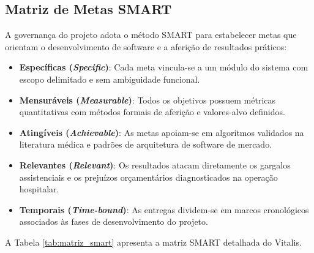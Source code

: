 \subsection{Matriz de Metas SMART}
\label{subsec:metas_smart}

A governança do projeto adota o método SMART para estabelecer metas que orientam o desenvolvimento de software e a aferição de resultados práticos:

\begin{itemize}[leftmargin=*]
    \item \textbf{Específicas (\textit{Specific})}: Cada meta vincula-se a um módulo do sistema com escopo delimitado e sem ambiguidade funcional.
    \item \textbf{Mensuráveis (\textit{Measurable})}: Todos os objetivos possuem métricas quantitativas com métodos formais de aferição e valores-alvo definidos.
    \item \textbf{Atingíveis (\textit{Achievable})}: As metas apoiam-se em algoritmos validados na literatura médica e padrões de arquitetura de software de mercado.
    \item \textbf{Relevantes (\textit{Relevant})}: Os resultados atacam diretamente os gargalos assistenciais e os prejuízos orçamentários diagnosticados na operação hospitalar.
    \item \textbf{Temporais (\textit{Time-bound})}: As entregas dividem-se em marcos cronológicos associados às fases de desenvolvimento do projeto.
\end{itemize}

A Tabela \ref{tab:matriz_smart} apresenta a matriz SMART detalhada do Vitalis.

